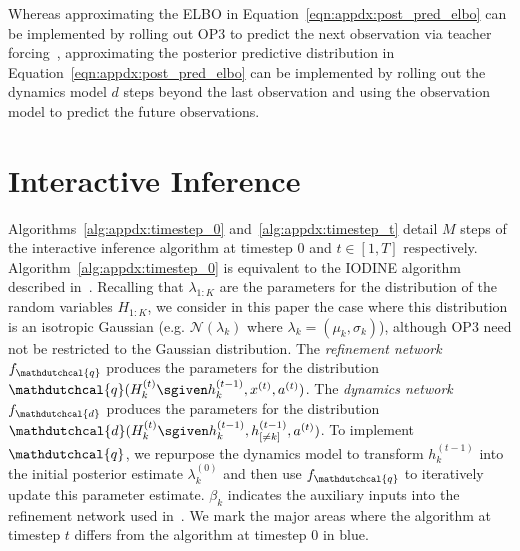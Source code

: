Whereas approximating the ELBO in Equation~\ref{eqn:appdx:post_pred_elbo} can be implemented by rolling out OP3 to predict the next observation via teacher forcing~\citep{williams1989learning}, approximating the posterior predictive distribution in Equation~\ref{eqn:appdx:post_pred_elbo} can be implemented by rolling out the dynamics model $d$ steps beyond the last observation and using the observation model to predict the future observations.


\section{Interactive Inference} \label{appdx:interactive_inference}
Algorithms~\ref{alg:appdx:timestep_0} and~\ref{alg:appdx:timestep_t} detail $M$ steps of the interactive inference algorithm at timestep $0$ and $t \in [1, T]$ respectively.
Algorithm~\ref{alg:appdx:timestep_0} is equivalent to the IODINE algorithm described in~\citep{greff2019iodine}.
Recalling that $\lambda_{1:K}$ are the parameters for the distribution of the random variables $H_{1:K}$, we consider in this paper the case where this distribution is an isotropic Gaussian (e.g. $\mathcal{N}(\lambda_k)$ where $\lambda_k = (\mu_k, \sigma_k)$), although OP3 need not be restricted to the Gaussian distribution.
The \textit{refinement network} $f_{\mathdutchcal{q}}$ produces the parameters for the distribution $\mathdutchcal{q}(H^{(t)}_{k} \sgiven h^{(t-1)}_{k}, x^{(t)}, a^{(t)})$.
The \textit{dynamics network} $f_{\mathdutchcal{d}}$ produces the parameters for the distribution $\mathdutchcal{d}(H^{(t)}_k \sgiven h^{(t-1)}_k, h^{(t-1)}_{[\neq k]}, a^{(t)})$.
To implement $\mathdutchcal{q}$, we repurpose the dynamics model to transform $h_k^{(t-1)}$ into the initial posterior estimate $\lambda_k^{(0)}$ and then use $f_{\mathdutchcal{q}}$ to iteratively update this parameter estimate.
$\beta_k$ indicates the auxiliary inputs into the refinement network used in~\citep{greff2019iodine}.
We mark the major areas where the algorithm at timestep $t$ differs from the algorithm at timestep $0$ in \textcolor{NavyBlue}{blue}.

